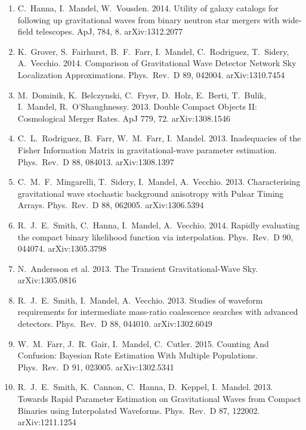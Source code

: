 \documentclass[margin,line]{res}
\begin{document}
\begin{resume}
\begin{enumerate}
\item  C.~Hanna, I.~Mandel, W.~Vousden.  2014. Utility of galaxy catalogs for following up gravitational waves from binary neutron star mergers with wide-field telescopes. ApJ, 784, 8.  arXiv:1312.2077

\item  K.~Grover, S.~Fairhurst, B.~F.~Farr, I.~Mandel, C.~Rodriguez, T.~Sidery, A.~Vecchio.  2014.  Comparison of Gravitational Wave Detector Network Sky Localization Approximations.  Phys.~Rev.~D 89, 042004.  arXiv:1310.7454

\item  M.~Dominik, K.~Belczynski, C.~Fryer, D.~Holz, E.~Berti, T.~Bulik, I.~Mandel, R.~O'Shaughnessy. 2013.  Double Compact Objects II: Cosmological Merger Rates.  ApJ 779, 72. arXiv:1308.1546

\item  C.~L.~Rodriguez, B.~Farr, W.~M.~Farr, I.~Mandel.  2013.  Inadequacies of the Fisher Information Matrix in gravitational-wave parameter estimation.  Phys.~Rev.~D 88, 084013.  arXiv:1308.1397 

\item  C.~M.~F.~Mingarelli, T.~Sidery, I.~Mandel, A.~Vecchio.  2013.  Characterising gravitational wave stochastic background anisotropy with Pulsar Timing Arrays.  Phys.~Rev.~D 88, 062005. arXiv:1306.5394

\item  R.~J.~E.~Smith, C.~Hanna, I.~Mandel, A.~Vecchio.  2014.  Rapidly evaluating the compact binary likelihood function via interpolation.  Phys.~Rev.~D 90, 044074. arXiv:1305.3798

\item  N.~Andersson et al.  2013.  The Transient Gravitational-Wave Sky.  arXiv:1305.0816

\item  R.~J.~E.~Smith, I.~Mandel, A.~Vecchio. 2013.  Studies of waveform requirements for intermediate mass-ratio coalescence searches with advanced detectors. Phys.~Rev.~D 88, 044010.  arXiv:1302.6049

\item  W.~M.~Farr, J.~R.~Gair, I.~Mandel, C.~Cutler.  2015.  Counting And Confusion: Bayesian Rate Estimation With Multiple Populations.  Phys.~Rev.~D 91, 023005. arXiv:1302.5341

\item  R.~J.~E.~Smith, K.~Cannon, C.~Hanna, D.~Keppel, I.~Mandel. 2013. Towards Rapid Parameter Estimation on Gravitational Waves from Compact Binaries using Interpolated Waveforms.  Phys.~Rev.~D 87, 122002.  arXiv:1211.1254


\end{enumerate}
\end{resume}
\end{document}
